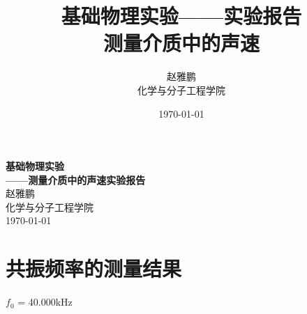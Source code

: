 \documentclass[1pt]{article}
\title{{\Huge{\textbf{基础物理实验——实验报告}}}\\测量介质中的声速}
\author{赵雅鹏\qquad2100011762\\化学与分子工程学院}
\date{\today}
\begin{document}
  \begin{titlepage}
    \vspace*{\fill}
    \begin{center}
      {\Huge{\textbf{基础物理实验}}}\\[0.5cm]
		{\Huge{\textbf{——测量介质中的声速实验报告}}}\\[0.5cm]
      {\Large{赵雅鹏}}\\[0.4cm]
      {\Large{化学与分子工程学院}}\\[0.3cm]
      {\Large{\today}}
    \end{center}
    \vspace*{\fill}
  \end{titlepage}

\setcounter{page}{1}
\newpage
{}
\setcounter{page}{1}
\setcounter{page}{1}



\section{共振频率的测量结果}
\centerline{$f_0$ = 40.000kHz}
\end{document}
